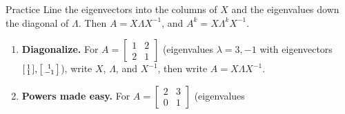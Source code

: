 \documentclass[10pt]{article}
\begin{document}
\namedateperiod

\vspace{0.12in}

\begin{notesbox}{Practice}
Line the eigenvectors into the columns of $X$ and the eigenvalues down the diagonal of $\Lambda$. Then
$A=X\Lambda X^{-1}$, and $A^k=X\Lambda^k X^{-1}$.

\begin{enumerate}[leftmargin=1.9em, itemsep=12pt]
  \item \textbf{Diagonalize.} For $A=\begin{bmatrix} 1 & 2 \\ 2 & 1 \end{bmatrix}$ (eigenvalues $\lambda=3,-1$
        with eigenvectors $\begin{bsmallmatrix}1\\1\end{bsmallmatrix},\begin{bsmallmatrix}1\\-1\end{bsmallmatrix}$),
        write $X$, $\Lambda$, and $X^{-1}$, then write $A=X\Lambda X^{-1}$.
  \item \textbf{Powers made easy.} For $A=\begin{bmatrix} 2 & 3 \\ 0 & 1 \end{bmatrix}$ (eigenvalues

\end{enumerate}
\end{notesbox}
\end{document}
